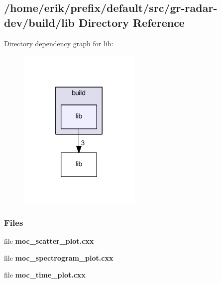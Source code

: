 \subsection{/home/erik/prefix/default/src/gr-\/radar-\/dev/build/lib Directory Reference}
\label{dir_27cfe71687c92b3f4aecf40d7ea49a5b}
Directory dependency graph for lib\+:
\nopagebreak
\begin{figure}[H]
\begin{center}
\leavevmode
\includegraphics[width=166pt]{dir_27cfe71687c92b3f4aecf40d7ea49a5b_dep}
\end{center}
\end{figure}
\subsubsection*{Files}
\begin{DoxyCompactItemize}
\item 
file {\bf moc\+\_\+scatter\+\_\+plot.\+cxx}
\item 
file {\bf moc\+\_\+spectrogram\+\_\+plot.\+cxx}
\item 
file {\bf moc\+\_\+time\+\_\+plot.\+cxx}
\end{DoxyCompactItemize}
